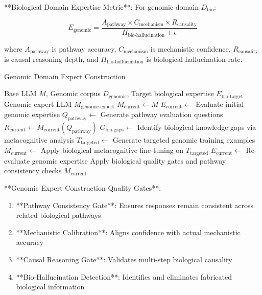 \documentclass[12pt,a4paper]{article}
\begin{document}
**Biological Domain Expertise Metric**: For genomic domain $D_{\text{bio}}$:

\begin{equation}
E_{\text{genomic}} = \frac{A_{\text{pathway}} \times C_{\text{mechanism}} \times R_{\text{causality}}}{H_{\text{bio-hallucination}} + \epsilon}
\end{equation}

where $A_{\text{pathway}}$ is pathway accuracy, $C_{\text{mechanism}}$ is mechanistic confidence, $R_{\text{causality}}$ is causal reasoning depth, and $H_{\text{bio-hallucination}}$ is biological hallucination rate.

\begin{algorithm}
\caption{Genomic Domain Expert Construction}
\begin{algorithmic}[1]
\Require Base LLM $M$, Genomic corpus $D_{\text{genomic}}$, Target biological expertise $E_{\text{bio-target}}$
\Ensure Genomic expert LLM $M_{\text{genomic-expert}}$
\State $M_{\text{current}} \leftarrow M$
\State $E_{\text{current}} \leftarrow$ Evaluate initial genomic expertise
    \State $Q_{\text{pathway}} \leftarrow$ Generate pathway evaluation questions
    \State $R_{\text{current}} \leftarrow M_{\text{current}}(Q_{\text{pathway}})$
    \State $G_{\text{bio-gaps}} \leftarrow$ Identify biological knowledge gaps via metacognitive analysis
    \State $T_{\text{targeted}} \leftarrow$ Generate targeted genomic training examples
    \State $M_{\text{current}} \leftarrow$ Apply biological metacognitive fine-tuning on $T_{\text{targeted}}$
    \State $E_{\text{current}} \leftarrow$ Re-evaluate genomic expertise
    \State Apply biological quality gates and pathway consistency checks
\EndWhile
\Return $M_{\text{current}}$
\end{algorithmic}
\end{algorithm}

**Genomic Expert Construction Quality Gates**:
\begin{enumerate}
\item **Pathway Consistency Gate**: Ensures responses remain consistent across related biological pathways
\item **Mechanistic Calibration**: Aligns confidence with actual mechanistic accuracy  
\item **Causal Reasoning Gate**: Validates multi-step biological causality
\item **Bio-Hallucination Detection**: Identifies and eliminates fabricated biological information
\end{enumerate}
\end{document}
